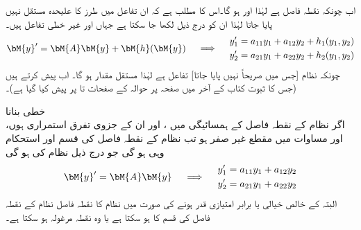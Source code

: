 اب چونکہ  نقطہ فاصل ہے لہٰذا اور    ہو گا۔اس کا مطلب ہے کہ ان تفاعل میں  طرز کا علیحدہ مستقل نہیں پایا جاتا لہٰذا ان کو درج ذیل لکھا جا سکتا ہے جہاں  اور  غیر خطی تفاعل ہیں۔
\begin{gather}\label{مساوات_نظام_غیر_خطی_ترکیب_مرحلہ_ب}
\begin{aligned}
\bM{y}'=\bM{A}\bM{y}+\bM{h}(\bM{y})
\end{aligned} \quad \implies \quad 
\begin{aligned}
y_1'&=a_{11}y_1+a_{12}y_2+h_1(y_1,y_2)\\
y_2'&=a_{21}y_1+a_{22}y_2+h_2(y_1,y_2)
\end{aligned}
\end{gather}
چونکہ نظام   [جس میں  صریحاً نہیں پایا جاتا] تفاعل ہے لہٰذا  مستقل مقدار ہو گا۔ اب  پیش کرتے ہیں (جس کا ثبوت کتاب کے آخر میں صفحہ  پر حوالہ \cite{حوالہ_کریزگ_الف_سات} کے صفحات  تا  پر پیش کیا گیا ہے)۔

\quad خطی بنانا\\
اگر نظام  کے نقطہ فاصل  کے ہمسائیگی میں  ،  اور ان کے جزوی تفرق استمراری ہوں، اور  مساوات  میں مقطع  غیر صفر  ہو تب نظام  کے نقطہ فاصل کی قسم اور استحکام وہی ہو گی جو درج ذیل  نظام کی ہو گی
\begin{gather}\label{مساوات_نظام_غیر_خطی_ترکیب_مرحلہ_پ}
\begin{aligned}
\bM{y}'=\bM{A}\bM{y}
\end{aligned} \quad \implies \quad 
\begin{aligned}
y_1'&=a_{11}y_1+a_{12}y_2\\
y_2'&=a_{21}y_1+a_{22}y_2
\end{aligned}
\end{gather}
البتہ  کے خالص خیالی یا برابر امتیازی قدر ہونے کی صورت میں نظام  کا نقطہ فاصل نظام  کے نقطہ فاصل کی قسم کا ہو سکتا ہے یا وہ نقطہ مرغولہ ہو سکتا ہے۔ 

